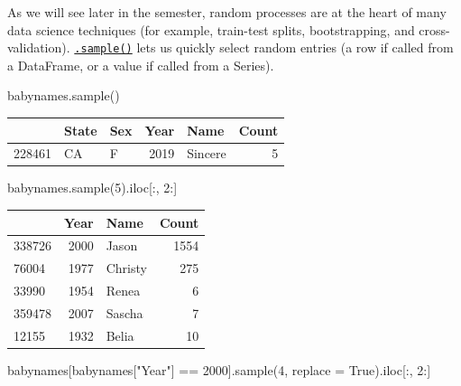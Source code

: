 \documentclass[
  letterpaper,
  DIV=11,
  numbers=noendperiod]{scrreprt}
\newenvironment{Shaded}{\begin{snugshade}}{\end{snugshade}}
\newcommand{\DecValTok}[1]{\textcolor[rgb]{0.68,0.00,0.00}{#1}}
\newcommand{\NormalTok}[1]{\textcolor[rgb]{0.00,0.23,0.31}{#1}}
\newcommand{\OperatorTok}[1]{\textcolor[rgb]{0.37,0.37,0.37}{#1}}
\newcommand{\StringTok}[1]{\textcolor[rgb]{0.13,0.47,0.30}{#1}}
\newcommand{\VariableTok}[1]{\textcolor[rgb]{0.07,0.07,0.07}{#1}}
\begin{document}
As we will see later in the semester, random processes are at the heart
of many data science techniques (for example, train-test splits,
bootstrapping, and cross-validation).
\href{https://pandas.pydata.org/docs/reference/api/pandas.DataFrame.sample.html}{\texttt{.sample()}}
lets us quickly select random entries (a row if called from a DataFrame,
or a value if called from a Series).

\begin{Shaded}
\begin{Highlighting}[]
\NormalTok{babynames.sample()}
\end{Highlighting}
\end{Shaded}

\begin{tabular}{lllrlr}
\toprule
{} & State & Sex &  Year &     Name &  Count \\
\midrule
228461 &    CA &   F &  2019 &  Sincere &      5 \\
\bottomrule
\end{tabular}

\begin{Shaded}
\begin{Highlighting}[]
\NormalTok{babynames.sample(}\DecValTok{5}\NormalTok{).iloc[:, }\DecValTok{2}\NormalTok{:]}
\end{Highlighting}
\end{Shaded}

\begin{tabular}{lrlr}
\toprule
{} &  Year &     Name &  Count \\
\midrule
338726 &  2000 &    Jason &   1554 \\
76004  &  1977 &  Christy &    275 \\
33990  &  1954 &    Renea &      6 \\
359478 &  2007 &   Sascha &      7 \\
12155  &  1932 &    Belia &     10 \\
\bottomrule
\end{tabular}

\begin{Shaded}
\begin{Highlighting}[]
\NormalTok{babynames[babynames[}\StringTok{"Year"}\NormalTok{] }\OperatorTok{==} \DecValTok{2000}\NormalTok{].sample(}\DecValTok{4}\NormalTok{, replace }\OperatorTok{=} \VariableTok{True}\NormalTok{).iloc[:, }\DecValTok{2}\NormalTok{:]}
\end{Highlighting}
\end{Shaded}
\end{document}
